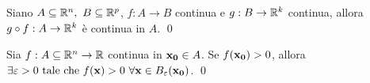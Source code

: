 \begin{theorem}
    Siano $A \subseteq \mathbb{R}^n, \ B \subseteq \mathbb{R}^p$, $f: A \to B$ continua e $g: B \to \mathbb{R}^k$ continua, allora $g \circ f: A \to \mathbb{R}^k$ è continua in $A$.
    \qed
\end{theorem}

\begin{theorem}
    \label{thm:sign}
    Sia $f: A \subseteq \mathbb{R}^n \to \mathbb{R}$ continua in $\vb{x_0}\in A$. Se $f(\vb{x_0})>0$, allora $\exists \varepsilon > 0 \tc f(\vb{x}) > 0 \ \forall \vb{x} \in B_\varepsilon(\vb{x_0})$.
    \qed
\end{theorem}